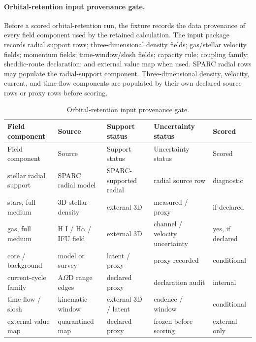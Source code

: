 \paragraph{Orbital-retention input provenance gate.}
Before a scored orbital-retention run, the fixture records the data provenance of every field component used by the retained calculation. The input package records radial support rows; three-dimensional density fields; gas/stellar velocity fields; momentum fields; time-window/slosh fields; capacity rule; coupling family; sheddic-route declaration; and external value map when used. SPARC radial rows may populate the radial-support component. Three-dimensional density, velocity, current, and time-flow components are populated by their own declared source rows or proxy rows before scoring.

\scriptsize
\begin{longtable}{p{}p{}p{}p{}p{}}
\caption{Orbital-retention input provenance gate.}\label{tab:orbital-retention-input-provenance}\\
\toprule
Field component & Source & Support status & Uncertainty status & Scored\\
\midrule
\endfirsthead
\toprule
Field component & Source & Support status & Uncertainty status & Scored\\
\midrule
\endhead
stellar radial support & SPARC radial model & SPARC-supported radial & radial source row & diagnostic\\
stars, full medium & 3D stellar density & external 3D & measured / proxy & if declared\\
gas, full medium & H I / H\(\alpha\) / IFU field & external 3D & channel / velocity uncertainty & yes, if declared\\
core / background & model or survey & latent / proxy & proxy recorded & conditional\\
current-cycle family & A\(\Omega\)D range edges & declared proxy & declaration audit & internal\\
time-flow / slosh & kinematic window & external 3D / latent & cadence / window & conditional\\
external value map & quarantined map & declared proxy & frozen before scoring & external only\\
\bottomrule
\end{longtable}
\normalsize


